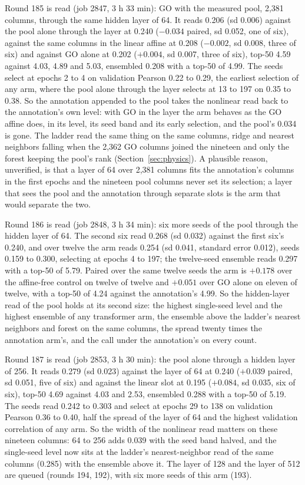 Round 185 is read (job 2847, 3 h 33 min): GO with the measured pool, 2,381 columns,
through the same hidden layer of 64. It reads 0.206 (sd 0.006) against the pool alone
through the layer at 0.240 ($-0.034$ paired, sd 0.052, one of six), against the same
columns in the linear affine at 0.208 ($-0.002$, sd 0.008, three of six) and against
GO alone at 0.202 ($+0.004$, sd 0.007, three of six), top-50 4.59 against 4.03, 4.89
and 5.03, ensembled 0.208 with a top-50 of 4.99. The seeds select at epochs 2 to 4 on
validation Pearson 0.22 to 0.29, the earliest selection of any arm, where the pool
alone through the layer selects at 13 to 197 on 0.35 to 0.38. So the annotation
appended to the pool takes the nonlinear read back to the annotation's own level: with
GO in the layer the arm behaves as the GO affine does, in its level, its seed band and
its early selection, and the pool's 0.034 is gone. The ladder read the same thing on
the same columns, ridge and nearest neighbors falling when the 2,362 GO columns joined
the nineteen and only the forest keeping the pool's rank (Section~\ref{sec:physics}).
A plausible reason, unverified, is that a layer of 64 over 2,381 columns fits the
annotation's columns in the first epochs and the nineteen pool columns never set its
selection; a layer that sees the pool and the annotation through separate slots is
the arm that would separate the two.

Round 186 is read (job 2848, 3 h 34 min): six more seeds of the pool through the
hidden layer of 64. The second six read 0.268 (sd 0.032) against the first six's 0.240,
and over twelve the arm reads 0.254 (sd 0.041, standard error 0.012), seeds 0.159 to
0.300, selecting at epochs 4 to 197; the twelve-seed ensemble reads 0.297 with a top-50
of 5.79. Paired over the same twelve seeds the arm is $+0.178$ over the affine-free
control on twelve of twelve and $+0.051$ over GO alone on eleven of twelve, with a
top-50 of 4.24 against the annotation's 4.99. So the hidden-layer read of the pool
holds at its second size: the highest single-seed level and the highest ensemble of any
transformer arm, the ensemble above the ladder's nearest neighbors and forest on the
same columns, the spread twenty times the annotation arm's, and the call under the
annotation's on every count.

Round 187 is read (job 2853, 3 h 30 min): the pool alone through a hidden layer of
256. It reads 0.279 (sd 0.023) against the layer of 64 at 0.240 ($+0.039$ paired, sd
0.051, five of six) and against the linear slot at 0.195 ($+0.084$, sd 0.035, six of
six), top-50 4.69 against 4.03 and 2.53, ensembled 0.288 with a top-50 of 5.19. The
seeds read 0.242 to 0.303 and select at epochs 29 to 138 on validation Pearson 0.36 to
0.40, half the spread of the layer of 64 and the highest validation correlation of any
arm. So the width of the nonlinear read matters on these nineteen columns: 64 to 256
adds 0.039 with the seed band halved, and the single-seed level now sits at the
ladder's nearest-neighbor read of the same columns (0.285) with the ensemble above it.
The layer of 128 and the layer of 512 are queued (rounds 194, 192), with six more seeds
of this arm (193).

